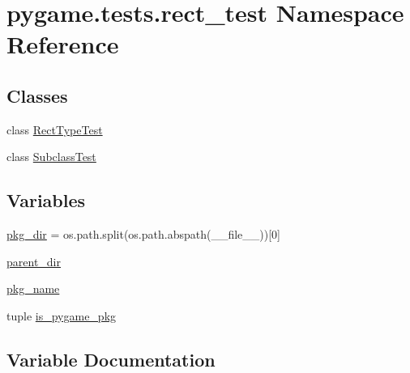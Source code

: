 \hypertarget{namespacepygame_1_1tests_1_1rect__test}{}\section{pygame.\+tests.\+rect\+\_\+test Namespace Reference}
\label{namespacepygame_1_1tests_1_1rect__test}
\subsection*{Classes}
\begin{DoxyCompactItemize}
\item 
class \hyperlink{classpygame_1_1tests_1_1rect__test_1_1_rect_type_test}{Rect\+Type\+Test}
\item 
class \hyperlink{classpygame_1_1tests_1_1rect__test_1_1_subclass_test}{Subclass\+Test}
\end{DoxyCompactItemize}
\subsection*{Variables}
\begin{DoxyCompactItemize}
\item 
\hyperlink{namespacepygame_1_1tests_1_1rect__test_a0d8bb19f834dd8fc8017b18ec3e4f175}{pkg\+\_\+dir} = os.\+path.\+split(os.\+path.\+abspath(\+\_\+\+\_\+file\+\_\+\+\_\+))\mbox{[}0\mbox{]}
\item 
\hyperlink{namespacepygame_1_1tests_1_1rect__test_a7ca3823df4bb2064afd81526a88fb546}{parent\+\_\+dir}
\item 
\hyperlink{namespacepygame_1_1tests_1_1rect__test_a1e94dd5a4ba8151946a1b014667ff3a3}{pkg\+\_\+name}
\item 
tuple \hyperlink{namespacepygame_1_1tests_1_1rect__test_a4de53b27285c70aeabc89bdd1752c72e}{is\+\_\+pygame\+\_\+pkg}
\end{DoxyCompactItemize}


\subsection{Variable Documentation}
\mbox{\label{namespacepygame_1_1tests_1_1rect__test_a4de53b27285c70aeabc89bdd1752c72e}} 
